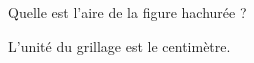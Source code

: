 
\begin{exercice}\label{exo2smath-0322}

    Quelle est l'aire de la figure hachurée ?

\begin{center}
   
\end{center}

L'unité du grillage est le centimètre.

\end{exercice}
